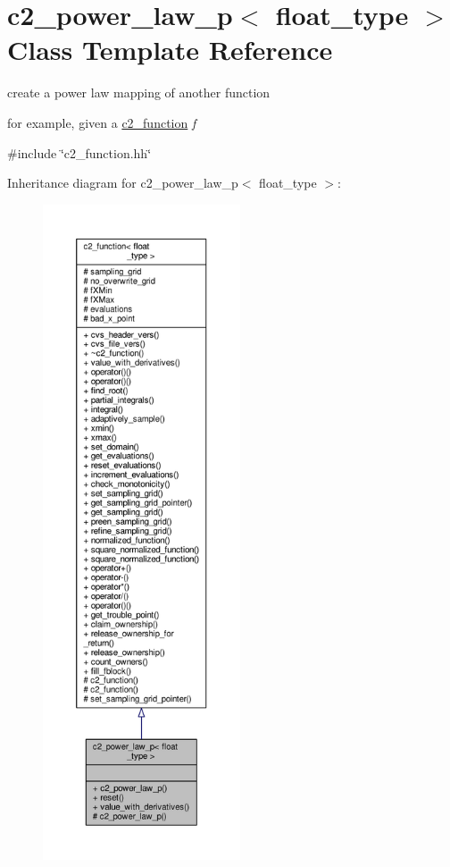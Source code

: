 \hypertarget{classc2__power__law__p}{}\section{c2\+\_\+power\+\_\+law\+\_\+p$<$ float\+\_\+type $>$ Class Template Reference}
\label{classc2__power__law__p}


create a power law mapping of another function

for example, given a \hyperlink{classc2__function}{c2\+\_\+function} {\itshape f}  




{\ttfamily \#include \char`\"{}c2\+\_\+function.\+hh\char`\"{}}



Inheritance diagram for c2\+\_\+power\+\_\+law\+\_\+p$<$ float\+\_\+type $>$\+:
\nopagebreak
\begin{figure}[H]
\begin{center}
\leavevmode
\includegraphics[height=550pt]{classc2__power__law__p__inherit__graph}
\end{center}
\end{figure}


